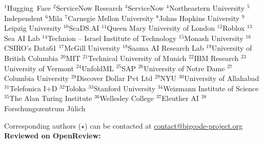 \begin{center}
$^{1}$Hugging~Face \quad
$^{2}$ServiceNow Research\quad
$^{3}$ServiceNow\quad
$^{4}$Northeastern University\quad
$^{5}$Independent\quad
$^{6}$Mila\quad
$^{7}$Carnegie Mellon University\quad
$^{8}$Johns Hopkins University\quad
$^{9}$Leipzig University\quad
$^{10}$ScaDS.AI\quad
$^{11}$Queen Mary University of London\quad
$^{12}$Roblox\quad
$^{13}$Sea AI Lab\quad
$^{14}$Technion -- Israel Institute of Technology\quad
$^{15}$Monash University\quad
$^{16}$CSIRO's Data61\quad
$^{17}$McGill University\quad
$^{18}$Saama AI Research Lab\quad
$^{19}$University of British Columbia\quad
$^{20}$MIT\quad
$^{21}$Technical University of Munich\quad
$^{22}$IBM Research\quad
$^{23}$University of Vermont\quad
$^{24}$UnfoldML\quad
$^{25}$SAP\quad
$^{26}$University of Notre Dame\quad
$^{27}$Columbia University\quad
$^{28}$Discover Dollar Pvt Ltd\quad
$^{29}$NYU\quad
$^{30}$University of Allahabad\quad
$^{31}$Telefonica I+D\quad
$^{32}$Toloka\quad
$^{33}$Stanford University\quad
$^{34}$Weizmann Institute of Science\quad
$^{35}$The Alan Turing Institute\quad
$^{36}$Wellesley College\quad
$^{37}$Eleuther AI\quad
$^{38}$Forschungszentrum J{\"u}lich\quad

Corresponding authors ($\star$) can be contacted at \href{contact@bigcode-project.org}{contact@bigcode-project.org}\\
\vspace{0.5cm}
{\bf Reviewed on OpenReview:} \openreview
\end{center}